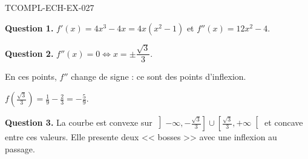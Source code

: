 \begin{corrige}{TCOMPL-ECH-EX-027}

\textbf{Question 1.} $f'(x) = 4x^3 - 4x = 4x(x^2-1)$ et $f''(x) = 12x^2 - 4$.


\textbf{Question 2.} $f''(x) = 0 \iff x = \pm\dfrac{\sqrt{3}}{3}$.

En ces points, $f''$ change de signe : ce sont des points d'inflexion.

$\displaystyle f\!\left(\frac{\sqrt{3}}{3}\right) = \frac{1}{9} - \frac{2}{3} = -\frac{5}{9}$.

\textbf{Question 3.} La courbe est convexe sur $\left]-\infty, -\frac{\sqrt3}{3}\right] \cup \left[\frac{\sqrt3}{3}, +\infty\right[$ et concave entre ces valeurs. Elle presente deux << bosses >> avec une inflexion au passage.

\end{corrige}
